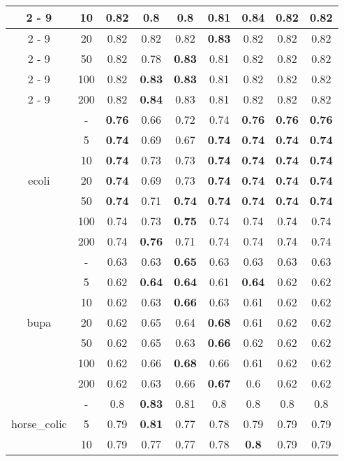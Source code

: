 \documentclass{article}%
\begin{document}
\begin{longtable}{c|c|ccccccc}
\cline{2%
-%
9}%
&10&0.82&0.8&0.8&0.81&\textbf{0.84}&0.82&0.82\\%
\cline{2%
-%
9}%
&20&0.82&0.82&0.82&\textbf{0.83}&0.82&0.82&0.82\\%
\cline{2%
-%
9}%
&50&0.82&0.78&\textbf{0.83}&0.81&0.82&0.82&0.82\\%
\cline{2%
-%
9}%
&100&0.82&\textbf{0.83}&\textbf{0.83}&0.81&0.82&0.82&0.82\\%
\cline{2%
-%
9}%
&200&0.82&\textbf{0.84}&0.83&0.81&0.82&0.82&0.82\\%
\hline%
\multirow{7}{*}{ecoli}&{-}&\textbf{0.76}&0.66&0.72&0.74&\textbf{0.76}&\textbf{0.76}&\textbf{0.76}\\%
\cline{2%
-%
9}%
&5&\textbf{0.74}&0.69&0.67&\textbf{0.74}&\textbf{0.74}&\textbf{0.74}&\textbf{0.74}\\%
\cline{2%
-%
9}%
&10&\textbf{0.74}&0.73&0.73&\textbf{0.74}&\textbf{0.74}&\textbf{0.74}&\textbf{0.74}\\%
\cline{2%
-%
9}%
&20&\textbf{0.74}&0.69&0.73&\textbf{0.74}&\textbf{0.74}&\textbf{0.74}&\textbf{0.74}\\%
\cline{2%
-%
9}%
&50&\textbf{0.74}&0.71&\textbf{0.74}&\textbf{0.74}&\textbf{0.74}&\textbf{0.74}&\textbf{0.74}\\%
\cline{2%
-%
9}%
&100&0.74&0.73&\textbf{0.75}&0.74&0.74&0.74&0.74\\%
\cline{2%
-%
9}%
&200&0.74&\textbf{0.76}&0.71&0.74&0.74&0.74&0.74\\%
\hline%
\multirow{7}{*}{bupa}&{-}&0.63&0.63&\textbf{0.65}&0.63&0.63&0.63&0.63\\%
\cline{2%
-%
9}%
&5&0.62&\textbf{0.64}&\textbf{0.64}&0.61&\textbf{0.64}&0.62&0.62\\%
\cline{2%
-%
9}%
&10&0.62&0.63&\textbf{0.66}&0.63&0.61&0.62&0.62\\%
\cline{2%
-%
9}%
&20&0.62&0.65&0.64&\textbf{0.68}&0.61&0.62&0.62\\%
\cline{2%
-%
9}%
&50&0.62&0.65&0.63&\textbf{0.66}&0.62&0.62&0.62\\%
\cline{2%
-%
9}%
&100&0.62&0.66&\textbf{0.68}&0.66&0.61&0.62&0.62\\%
\cline{2%
-%
9}%
&200&0.62&0.63&0.66&\textbf{0.67}&0.6&0.62&0.62\\%
\hline%
\multirow{7}{*}{horse\_colic}&{-}&0.8&\textbf{0.83}&0.81&0.8&0.8&0.8&0.8\\%
\cline{2%
-%
9}%
&5&0.79&\textbf{0.81}&0.77&0.78&0.79&0.79&0.79\\%
\cline{2%
-%
9}%
&10&0.79&0.77&0.77&0.78&\textbf{0.8}&0.79&0.79\\%

\end{longtable}
\end{document}
